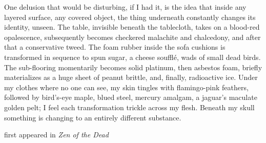 
One delusion that would be disturbing, if I had it, is the idea that
inside any layered surface, any covered object, the thing underneath
constantly changes its identity, unseen. The table, invisible beneath
the tablecloth, takes on a blood-red opalescence, subsequently becomes
checkered malachite and chalcedony, and after that a conservative tweed.
The foam rubber inside the sofa cushions is transformed in sequence to
spun sugar, a cheese soufflé, wads of small dead birds. The sub-flooring
momentarily becomes solid platinum, then asbestos foam, briefly
materializes as a huge sheet of peanut brittle, and, finally,
radioactive ice. Under my clothes where no one can see, my skin tingles
with flamingo-pink feathers, followed by bird's-eye maple, blued steel,
mercury amalgam, a jaguar's maculate golden pelt; I feel each
transformation trickle across my flesh. Beneath my skull something is
changing to an entirely different substance.

first appeared in \emph{Zen of the Dead}

